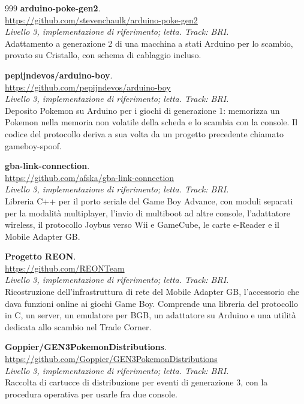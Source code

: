 \begin{thebibliography}{999}
  \textbf{arduino-poke-gen2}.
  \\ \url{https://github.com/stevenchaulk/arduino-poke-gen2}
  \\ \emph{Livello 3, implementazione di riferimento; letta. Track: BRI.}
  \\ Adattamento a generazione 2 di una macchina a stati Arduino per lo scambio, provato su Cristallo, con schema di cablaggio incluso.

  \textbf{pepijndevos/arduino-boy}.
  \\ \url{https://github.com/pepijndevos/arduino-boy}
  \\ \emph{Livello 3, implementazione di riferimento; letta. Track: BRI.}
  \\ Deposito Pokemon su Arduino per i giochi di generazione 1: memorizza un Pokemon nella memoria non volatile della scheda e lo scambia con la console. Il codice del protocollo deriva a sua volta da un progetto precedente chiamato gameboy-spoof.

  \textbf{gba-link-connection}.
  \\ \url{https://github.com/afska/gba-link-connection}
  \\ \emph{Livello 3, implementazione di riferimento; letta. Track: BRI.}
  \\ Libreria C++ per il porto seriale del Game Boy Advance, con moduli separati per la modalità multiplayer, l'invio di multiboot ad altre console, l'adattatore wireless, il protocollo Joybus verso Wii e GameCube, le carte e-Reader e il Mobile Adapter GB.

  \textbf{Progetto REON}.
  \\ \url{https://github.com/REONTeam}
  \\ \emph{Livello 3, implementazione di riferimento; letta. Track: BRI.}
  \\ Ricostruzione dell'infrastruttura di rete del Mobile Adapter GB, l'accessorio che dava funzioni online ai giochi Game Boy. Comprende una libreria del protocollo in C, un server, un emulatore per BGB, un adattatore su Arduino e una utilità dedicata allo scambio nel Trade Corner.

  \textbf{Goppier/GEN3PokemonDistributions}.
  \\ \url{https://github.com/Goppier/GEN3PokemonDistributions}
  \\ \emph{Livello 3, implementazione di riferimento; letta. Track: BRI.}
  \\ Raccolta di cartucce di distribuzione per eventi di generazione 3, con la procedura operativa per usarle fra due console.


\end{thebibliography}
